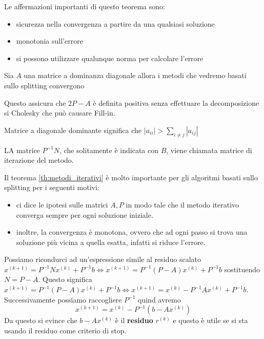 Le affermazioni importanti di questo teorema sono:
\begin{itemize}
    \item sicurezza nella convergenza a partire da una qualsiasi soluzione
    \item monotonia sull'errore
    \item si possono utilizzare qualunque norma per calcolare l'errore
\end{itemize}

\begin{teorema}
    Sia $A$ una matrice a dominanza diagonale allora i metodi che vedremo basati
    sullo splitting convergono
\end{teorema}

Questo assicura che $2P-A$ è definita positiva senza effettuare la decomposizione
si Cholesky che può causare Fill-in.

\begin{nota}
    Matrice a diagonale dominante significa che $|a_{ii}| > \sum_{i\ne j}|a_{ij}|$
\end{nota}

\begin{definizione}
    LA matrice $P^{-1}N$, che solitamente è indicata con $B$, viene chiamata matrice
    di iterazione del metodo.
\end{definizione}

Il teorema \ref{th:metodi_iterativi} è molto importante per gli algoritmi basati
sullo splitting per i seguenti motivi:
\begin{itemize}
    \item ci dice le ipotesi sulle matrici $A, P$ in modo tale che il metodo iterativo
          converga sempre per ogni soluzione iniziale.
    \item inoltre, la convergenza è monotona, ovvero che ad ogni passo si trova
          una soluzione più vicina a quella esatta, infatti si riduce l'errore.
\end{itemize}

Possiamo ricondurci ad un'espressione simile al residuo scalato
$ x^{(k+1)}= P^{-1}Nx^{(k)}+P^{-1}b \iff x^{(k+1)} = P^{-1}(P-A)x^{(k)}+P^{-1}b$
sostituendo $N=P-A$. Questo significa $ x^{(k+1)} = P^{-1}(P-A)x^{(k)}+P^{-1}b\iff
    x^{(k+1)} = x^{(k)}-P^{-1}Ax^{(k)}+P^{-1}b$. Successivamente possiamo
raccogliere $P^{-1}$ quind avremo
$$x^{(k+1)} = x^{(k)}-P^{-1}(b-Ax^{(k)})$$
Da questo si evince che $b-Ax^{(k)}$ è il \textbf{residuo} $r^{(k)}$ e questo è
utile se si sta usando il residuo come criterio di stop.

